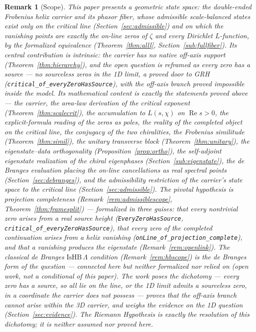 \documentclass[11pt]{article}
\newtheorem{remark}[definition]{Remark}
\DeclareMathOperator{\Ree}{Re}
\newcommand{\code}[1]{\texttt{#1}}
\begin{document}
\begin{remark}[Scope]\label{rem:scope}
This paper presents a geometric state space: the double-ended Frobenius helix carrier and its phasor
fiber, whose admissible scale-balanced states exist only on the critical line
(Section~\ref{sec:admissible}) and on which the vanishing points are \emph{exactly} the on-line zeros
of $\zeta$ and every Dirichlet $L$-function, by the formalized equivalence (Theorem~\ref{thm:alll},
Section~\ref{sub:fullfiber}). Its central
contribution is intrinsic: the carrier has \emph{no native off-axis support}
(Theorem~\ref{thm:hierarchy}), and the open question is reframed as \emph{every zero has a source}
--- no sourceless zeros in the 1D limit, a proved door to GRH (\code{critical\_of\_everyZeroHasSource}),
with the off-axis branch proved impossible inside the model.
Its mathematical content is exactly the
statements proved above --- the carrier, the area-law derivation of the critical exponent
(Theorem~\ref{thm:scalecrit}), the accumulation to $L(s,\chi)$ on $\Ree s>0$, the
explicit-formula reading of the zeros as poles, the reality of the completed object on the critical
line, the conjugacy of the two chiralities, the Frobenius similitude (Theorem~\ref{thm:simil}), the
unitary transverse block (Theorem~\ref{thm:unitary}), the eigenstate--data orthogonality
(Proposition~\ref{prop:ortho}), the self-adjoint eigenstate realization of the chiral eigenphases
(Section~\ref{sub:eigenstate}), the de Branges evaluation placing the on-line cancellations as real
spectral points (Section~\ref{sec:debranges}), and the admissibility restriction of the carrier's
state space to the critical line (Section~\ref{sec:admissible}). The pivotal hypothesis is
\emph{projection completeness}
(Remark~\ref{rem:admissiblescope}, Theorem~\ref{thm:framesplit}) --- formalized in three guises:
that every nontrivial zero arises from
a real source height (\code{EveryZeroHasSource}, \code{critical\_of\_everyZeroHasSource}), that every
zero of the completed continuation arises from a helix vanishing
(\code{onLine\_of\_projection\_complete}), and that a vanishing \emph{produces} the eigenstate
(Remark~\ref{rem:openlink}). The classical de Branges $\mathrm{IsHB}\,\Lambda$ condition
(Remark~\ref{rem:hbscope}) is the de Branges form of the question --- connected here but neither
formalized nor relied on (open work, not a conditional of this paper). The work poses the dichotomy ---
every zero has a source, so all lie on the line, \emph{or} the 1D limit admits a \emph{sourceless} zero,
in a coordinate the carrier does not possess ---
proves that the off-axis branch cannot arise within the 3D carrier, and weighs the evidence on the
1D question (Section~\ref{sec:evidence}). The Riemann Hypothesis is exactly the resolution of this
dichotomy; it is neither assumed nor proved here.
\end{remark}
\end{document}
